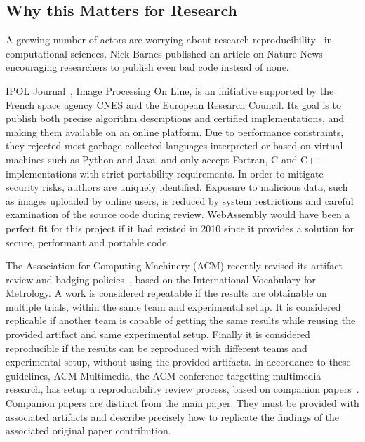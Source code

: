 \subsection{Why this Matters for Research}%
\label{sub:matter-research}

A growing number of actors are worrying about research
reproducibility~\cite{claerbout1992electronic, buckheit1995wavelab}
in computational sciences.
Nick Barnes published an article on Nature News~\cite{barnes2010publish}
encouraging researchers to publish even bad code instead of none.

IPOL Journal~\cite{limare2011ipol}, Image Processing On Line, is an initiative supported by
the French space agency CNES and the European Research Council.
Its goal is to publish both precise algorithm descriptions and certified implementations,
and making them available on an online platform.
Due to performance constraints, they rejected most garbage collected languages
interpreted or based on virtual machines such as Python and Java,
and only accept Fortran, C and C++ implementations with strict portability requirements.
In order to mitigate security risks, authors are uniquely identified.
Exposure to malicious data, such as images uploaded by online users,
is reduced by system restrictions and careful examination of the source code during review.
WebAssembly would have been a perfect fit for this project if it had existed in 2010
since it provides a solution for secure, performant and portable code.

The Association for Computing Machinery (ACM) recently revised its
artifact review and badging policies~\cite{acm2018badging},
based on the International Vocabulary for Metrology.
A work is considered repeatable if the results are obtainable on multiple trials,
within the same team and experimental setup.
It is considered replicable if another team is capable of getting the same results
while reusing the provided artifact and same experimental setup.
Finally it is considered reproducible if the results can be reproduced
with different teams and experimental setup, without using the provided artifacts.
In accordance to these guidelines, ACM Multimedia, the ACM conference targetting multimedia
research, has setup a reproducibility review process,
based on companion papers~\cite{acmmmreproducibility}.
Companion papers are distinct from the main paper.
They must be provided with associated artifacts and describe precisely
how to replicate the findings of the associated original paper contribution.

